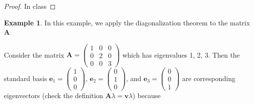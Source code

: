 \documentclass[
]{book}
\theoremstyle{definition}
\theoremstyle{definition}
\newtheorem{example}{Example}[chapter]
\theoremstyle{definition}
\theoremstyle{definition}
\theoremstyle{remark}
\begin{document}
\begin{proof}
In class
\end{proof}

\begin{example}
In this example, we apply the diagonalization theorem to the matrix \(\mathbf{A}\)

Consider the matrix \(\mathbf{A} = \begin{pmatrix} 1 & 0 & 0 \\ 0 & 2 & 0 \\ 0 & 0 & 3 \end{pmatrix}\) which has eigenvalues 1, 2, 3. Then the standard basis \(\mathbf{e}_1 = \begin{pmatrix} 1 \\ 0 \\ 0 \end{pmatrix}\), \(\mathbf{e}_2 = \begin{pmatrix} 0 \\ 1 \\ 0 \end{pmatrix}\), and \(\mathbf{e}_3 = \begin{pmatrix} 0 \\ 0 \\ 1 \end{pmatrix}\) are corresponding eigenvectors (check the definition \(\mathbf{A} \lambda = \mathbf{v} \lambda\)) because


\end{example}
\end{document}
